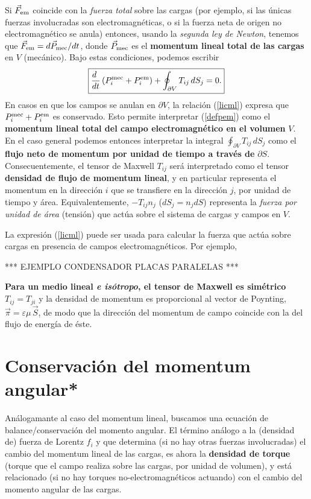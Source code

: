 Si $\vec{F}_{\rm em}$ coincide con la \textit{fuerza total} sobre las cargas (por ejemplo, si las únicas fuerzas involucradas son electromagnéticas, o si la fuerza neta de origen no electromagnético se anula) entonces, usando la \textit{segunda ley de Newton}, tenemos que $\vec{F}_{\rm em}=d\vec{P}_{\rm mec}/dt$, donde $\vec{P}_{\rm mec}$ es el \textbf{momentum lineal total de las cargas} en $V$ (mecánico). Bajo estas condiciones, podemos escribir
\begin{equation}
\boxed{\frac{d\ }{dt}\left(P_i^{\rm mec}+P_i^{\rm em}\right)+\oint_{\partial
V}T_{ij}\,dS_j =0.} \label{licml}
\end{equation}
En casos en que los campos se anulan en $\partial V$, la relación
(\ref{licml}) expresa que $P_i^{\rm mec}+P_i^{\rm em}$ es conservado. Esto
permite interpretar (\ref{defpem}) como el \textbf{momentum lineal total del
campo electromagnético en el volumen} $V$. En el caso general podemos entonces interpretar la integral $\oint_{\partial V}T_{ij}\,dS_j $ como el \textbf{flujo neto de momentum por unidad de tiempo
a través de} $\partial S$. Consecuentemente, el tensor de Maxwell $T_{ij}$
será interpretado como el tensor \textbf{densidad de flujo de momentum lineal}, y en particular representa el momentum en la dirección $i$ que se transfiere en la dirección $j$, por unidad de tiempo y área. Equivalentemente, $-T_{ij}n_j$ ($dS_j=n_jdS$)
representa la \textit{fuerza por unidad de área} (tensión) que actúa sobre el sistema
de cargas y campos en $V$.

La expresión (\ref{licml}) puede ser usada para calcular la fuerza que actúa
sobre cargas en presencia de campos electromagnéticos. Por ejemplo,

\begin{center}
*** EJEMPLO CONDENSADOR PLACAS PARALELAS ***
\end{center}

\textbf{Para un medio lineal \textit{e isótropo}, el tensor de Maxwell es simétrico
$T_{ij}=T_{ji}$} y la densidad de momentum es proporcional al vector de
Poynting, $\vec{\pi}=\varepsilon\mu\,\vec{S}$, de modo que la dirección del
momentum de campo coincide con la del flujo de energía de
éste.

\section{Conservación del momentum angular*}\label{sec:momentum_angular}
Análogamante al caso del momentum lineal, buscamos una ecuación de balance/conservación del momento angular. El término análogo a la (densidad de) fuerza de Lorentz $f_i$ y que determina (si no hay otras fuerzas involucradas) el cambio del momentum lineal de las cargas, es ahora la \textbf{densidad de torque} (torque que el campo realiza sobre las cargas, por unidad de volumen), y está relacionado (si no hay torques no-electromagnéticos actuando) con el cambio del momento angular de las cargas. 


